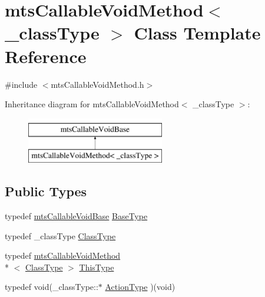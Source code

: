 \hypertarget{classmts_callable_void_method}{\section{mts\-Callable\-Void\-Method$<$ \-\_\-class\-Type $>$ Class Template Reference}
\label{classmts_callable_void_method}
}


{\ttfamily \#include $<$mts\-Callable\-Void\-Method.\-h$>$}

Inheritance diagram for mts\-Callable\-Void\-Method$<$ \-\_\-class\-Type $>$\-:\begin{figure}[H]
\begin{center}
\leavevmode
\includegraphics[height=2.000000cm]{df/d97/classmts_callable_void_method}
\end{center}
\end{figure}
\subsection*{Public Types}
\begin{DoxyCompactItemize}
\item 
typedef \hyperlink{classmts_callable_void_base}{mts\-Callable\-Void\-Base} \hyperlink{classmts_callable_void_method_a5afd27bcc6880473f6e89e712a189afc}{Base\-Type}
\item 
typedef \-\_\-class\-Type \hyperlink{classmts_callable_void_method_a912290d7a57cc13fd33481e16d471467}{Class\-Type}
\item 
typedef \hyperlink{classmts_callable_void_method}{mts\-Callable\-Void\-Method}\\*
$<$ \hyperlink{classmts_callable_void_method_a912290d7a57cc13fd33481e16d471467}{Class\-Type} $>$ \hyperlink{classmts_callable_void_method_ae73e9f4d10f5be65841fac6109f48e0b}{This\-Type}
\item 
typedef void(\-\_\-class\-Type\-::$\ast$ \hyperlink{classmts_callable_void_method_a04f6bc9a458aded32b2419d0fc63da4a}{Action\-Type} )(void)
\end{DoxyCompactItemize}

